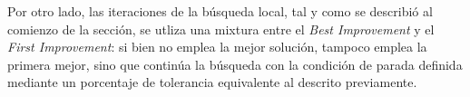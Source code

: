 Por otro lado, las iteraciones de la búsqueda local, tal y como se describió al comienzo de la sección, se utliza una mixtura entre el \textit{Best Improvement} y el \textit{First Improvement}: si bien no emplea la mejor solución, tampoco emplea la primera mejor, sino que continúa la búsqueda con la condición de parada definida mediante un porcentaje de tolerancia equivalente al descrito previamente.







